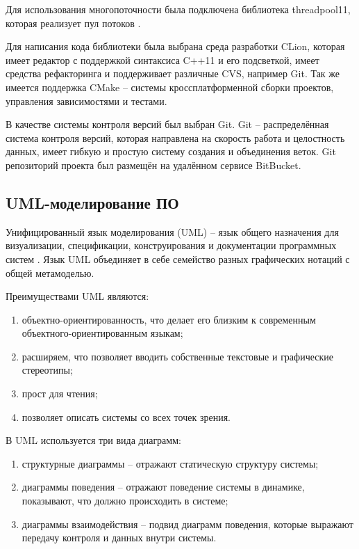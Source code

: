 Для использования многопоточности была подключена библиотека threadpool11, которая реализует пул потоков \cite{THREAD_POOL}.

Для написания кода библиотеки была выбрана среда разработки CLion, которая имеет редактор с поддержкой синтаксиса C++11 и его подсветкой, имеет средства рефакторинга и поддерживает различные CVS, например Git. Так же имеется поддержка CMake -- системы кроссплатформенной сборки проектов, управления зависимостями и тестами.

В качестве системы контроля версий был выбран Git. Git -- распределённая система контроля версий, которая направлена на скорость работа и целостность данных, имеет гибкую и простую систему создания и объединения веток. Git репозиторий проекта был размещён на удалённом сервисе BitBucket.

\subsection{UML-моделирование ПО}

Унифицированный язык моделирования (UML) -- язык общего назначения для визуализации, спецификации, конструирования и документации программных систем \cite{UML_USER_GUIDE_2ND}. Язык UML объединяет в себе семейство разных графических нотаций с общей метамоделью. 

Преимуществами UML являются:

\begin{enumerate}
    \item объектно-ориентированность, что делает его близким к современным объектного-ориентированным языкам;
    \item расширяем, что позволяет вводить собственные текстовые и графические стереотипы;
    \item прост для чтения;
    \item позволяет описать системы со всех точек зрения.
\end{enumerate}

В UML используется три вида диаграмм:

\begin{enumerate}
    \item структурные диаграммы -- отражают статическую структуру системы;
    \item диаграммы поведения -- отражают поведение системы в динамике, показывают, что должно происходить в системе;
    \item диаграммы взаимодействия -- подвид диаграмм поведения, которые выражают передачу контроля и данных внутри системы.
\end{enumerate} 

